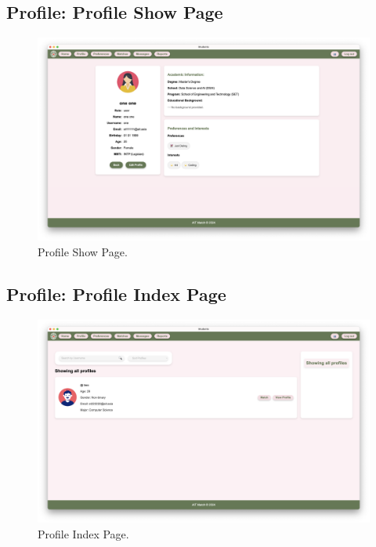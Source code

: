         \newpage
        \subsection{Profile: Profile Show Page}
        \begin{figure}[h]
                \centering
                \captionsetup{justification=centering, singlelinecheck=false, labelsep=space}
                \includegraphics[width=5in]{figures/results/profiles/show-profile-page.png} 
                \caption{Profile Show Page.}
                \label{fig:show-profile-page}
            \end{figure}

        \subsection{Profile: Profile Index Page}
        \begin{figure}[h]
                \centering
                \captionsetup{justification=centering, singlelinecheck=false, labelsep=space}
                \includegraphics[width=5in]{figures/results/profiles/profile-index-page.png} 
                \caption{Profile Index Page.}
                \label{fig:profile-index-page}
            \end{figure}
        \newpage
